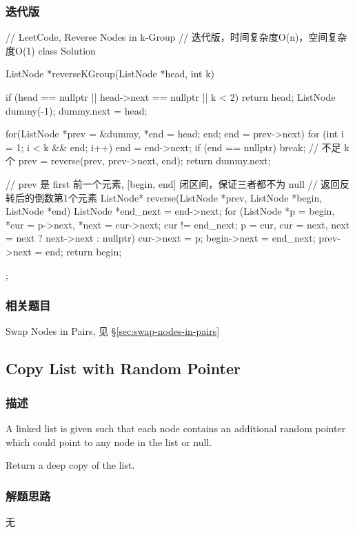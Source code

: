 \subsubsection{迭代版}
\begin{Code}
	// LeetCode, Reverse Nodes in k-Group
	// 迭代版，时间复杂度O(n)，空间复杂度O(1)
	class Solution {
		ListNode *reverseKGroup(ListNode *head, int k) {
			if (head == nullptr || head->next == nullptr || k < 2) return head;
			ListNode dummy(-1);
			dummy.next = head;
			
			for(ListNode *prev = &dummy, *end = head; end; end = prev->next) {
				for (int i = 1; i < k && end; i++)
					end = end->next;
				if (end  == nullptr) break;  // 不足 k 个
				prev = reverse(prev, prev->next, end);
			}
			return dummy.next;
		}
		
		// prev 是 first 前一个元素, [begin, end] 闭区间，保证三者都不为 null
		// 返回反转后的倒数第1个元素
		ListNode* reverse(ListNode *prev, ListNode *begin, ListNode *end) {
			ListNode *end_next = end->next;
			for (ListNode *p = begin, *cur = p->next, *next = cur->next; cur != end_next;
				p = cur, cur = next, next = next ? next->next : nullptr) {
				cur->next = p;
			}
			begin->next = end_next;
			prev->next = end;
			return begin;
		}
	};
\end{Code}


\subsubsection{相关题目}
\begindot
\item Swap Nodes in Pairs, 见 \S \ref{sec:swap-nodes-in-pairs}
\myenddot


\subsection{Copy List with Random Pointer}
\label{sec:copy-list-with-random-pointer}


\subsubsection{描述}
A linked list is given such that each node contains an additional random 
pointer which could point to any node in the list or null.

Return a deep copy of the list.


\subsubsection{解题思路}
无


